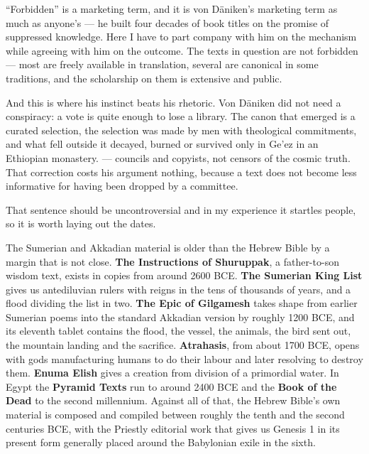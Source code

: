 ``Forbidden'' is a marketing term, and it is von Däniken's marketing term as much as anyone's ---
he built four decades of book titles on the promise of suppressed knowledge. Here I have to part
company with him on the mechanism while agreeing with him on the outcome. The texts in question are not forbidden --- most are freely
available in translation, several are canonical in some traditions, and the scholarship on them
is extensive and public. 

And this is where his instinct beats his rhetoric. Von Däniken did not need a conspiracy: a vote
is quite enough to lose a library. The canon that emerged is a curated selection, the selection
was made by men with theological commitments, and what fell outside it decayed, burned or survived
only in Ge'ez in an Ethiopian monastery.  --- councils and copyists, not censors of the
cosmic truth. That correction costs his argument nothing, because a text does not become less
informative for having been dropped by a committee.

 That
sentence should be uncontroversial and in my experience it startles people, so it is worth
laying out the dates.

The Sumerian and Akkadian material is older than the Hebrew Bible by a margin that is not
close. \textbf{The Instructions of Shuruppak}, a father-to-son wisdom text, exists in copies
from around 2600 BCE. \textbf{The Sumerian King List} gives us antediluvian rulers with
reigns in the tens of thousands of years, and a flood dividing the list in two. \textbf{The
Epic of Gilgamesh} takes shape from earlier Sumerian poems into the standard Akkadian version
by roughly 1200 BCE, and its eleventh tablet contains the flood, the vessel, the animals, the
bird sent out, the mountain landing and the sacrifice. \textbf{Atrahasis}, from about 1700
BCE, opens with gods manufacturing humans to do their labour and later resolving to destroy
them. \textbf{Enuma Elish} gives a creation from division of a primordial water. In Egypt the
\textbf{Pyramid Texts} run to around 2400 BCE and the \textbf{Book of the Dead} to the second
millennium. Against all of that, the Hebrew Bible's own material is composed and compiled
between roughly the tenth and the second centuries BCE, with the Priestly editorial work that
gives us Genesis 1 in its present form generally placed around the Babylonian exile in the
sixth. 


